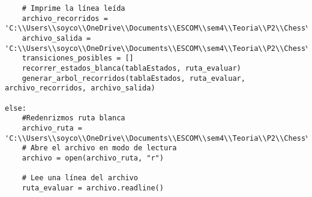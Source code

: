 \begin{enumerate}
\begin{lstlisting}
    # Imprime la línea leída
    archivo_recorridos = 'C:\\Users\\soyco\\OneDrive\\Documents\\ESCOM\\sem4\\Teoria\\P2\\Chess\\output\\recorridos_blanca.txt'
    archivo_salida = 'C:\\Users\\soyco\\OneDrive\\Documents\\ESCOM\\sem4\\Teoria\\P2\\Chess\\output\\arbol_blanca.dot'
    transiciones_posibles = []
    recorrer_estados_blanca(tablaEstados, ruta_evaluar)
    generar_arbol_recorridos(tablaEstados, ruta_evaluar, archivo_recorridos, archivo_salida)
    
else:
    #Redenrizmos ruta blanca
    archivo_ruta = 'C:\\Users\\soyco\\OneDrive\\Documents\\ESCOM\\sem4\\Teoria\\P2\\Chess\\output\\ruta_blanca.txt'
    # Abre el archivo en modo de lectura
    archivo = open(archivo_ruta, "r")

    # Lee una línea del archivo
    ruta_evaluar = archivo.readline()


\end{lstlisting}
\end{enumerate}
